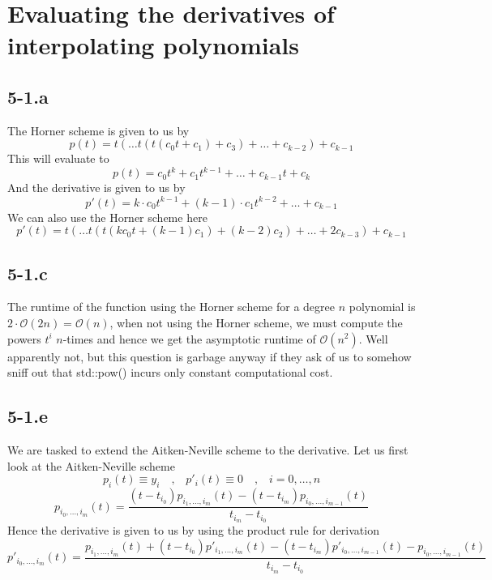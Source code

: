\documentclass{article}
\begin{document}
\section*{Evaluating the derivatives of interpolating polynomials}
\subsection*{5-1.a}
The Horner scheme is given to us by
\begin{equation*}
    p\left(t\right) = t\left(\dots t\left(t\left(c_{0}t + c_{1}\right) + c_{3}\right) + \dots + c_{k-2}\right) + c_{k-1}
\end{equation*}
This will evaluate to
\begin{equation*}
    p\left(t\right) = c_{0}t^{k} + c_{1}t^{k-1} + \dots + c_{k-1}t + c_{k}
\end{equation*}
And the derivative is given to us by
\begin{equation*}
    p'\left(t\right) = k\cdot c_{0}t^{k-1} + \left(k-1\right)\cdot c_{1}t^{k-2} + \dots + c_{k-1}
\end{equation*}
We can also use the Horner scheme here
\begin{equation*}
    p'\left(t\right) = t\left(\dots t\left(t\left(kc_{0}t + \left(k-1\right) c_{1}\right)+\left(k-2\right)c_{2}\right) + \dots + 2c_{k-3} \right) + c_{k-1}
\end{equation*}
\subsection*{5-1.c} The runtime of the function using the Horner scheme for a degree $n$ polynomial is $2 \cdot \mathcal{O}\left(2n\right) = \mathcal{O}\left(n\right)$, when not using the Horner scheme, we must compute the powers $t^{i}$ $n$-times and hence we get the asymptotic runtime of $\mathcal{O}\left(n^{2}\right)$. Well apparently not, but this question is garbage anyway if they ask of us to somehow sniff out that std::pow() incurs only constant computational cost.
\subsection*{5-1.e} We are tasked to extend the Aitken-Neville scheme to the derivative. Let us first look at the Aitken-Neville scheme
\begin{equation*}
    p_{i}\left(t\right) \equiv y_{i} 
 \quad\text{,} \quad p'_{i}\left(t\right) \equiv 0 \quad \text{,} \quad i = 0, \dots , n
\end{equation*}
\begin{equation*}
    p_{i_{0},\dots,i_{m}}\left(t\right) = \frac{\left(t-t_{i_{0}}\right)p_{i_{1},\dots,i_{m}}\left(t\right) - \left(t-t_{i_{m}}\right)p_{i_{0},\dots,i_{m-1}}\left(t\right)}{t_{i_{m}} - t_{i_{0}}}
\end{equation*}
Hence the derivative is given to us by using the product rule for derivation
\begin{equation*}
    p'_{i_{0},\dots,i_{m}}\left(t\right) =\frac{p_{i_{1},\dots,i_{m}}\left(t\right) + \left(t-t_{i_{0}}\right)p'_{i_{1},\dots,i_{m}}\left(t\right) - \left(t-t_{i_{m}}\right)p'_{i_{0},\dots,i_{m-1}}\left(t\right) -p_{i_{0},\dots,i_{m-1}}\left(t\right)}{t_{i_{m}} - t_{i_{0}}}
\end{equation*}
\end{document}

